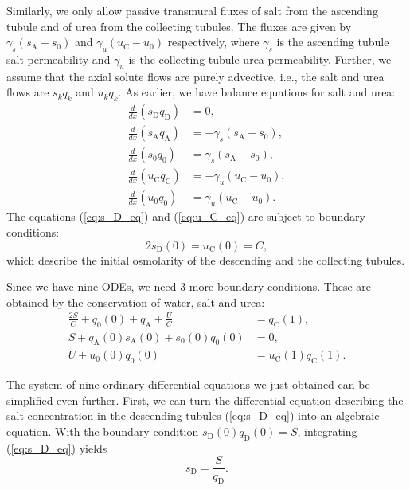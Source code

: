 \documentclass{article}
\numberwithin{equation}{section} %
\begin{document}
Similarly, we only allow passive transmural fluxes of salt from the ascending tubule and of urea from the collecting tubules.
The fluxes are given by $\gamma_s(s_\mathrm{A} - s_0)$ and $\gamma_u(u_\mathrm{C} - u_0)$ respectively, where $\gamma_s$ is the ascending tubule salt permeability and $\gamma_u$ is the collecting tubule urea permeability.
Further, we assume that the axial solute flows are purely advective, i.e., the salt and urea flows are $s_kq_k$ and $u_kq_k$.
As earlier, we have balance equations for salt and urea:
\begin{align}
    \frac{d}{dx}(s_\mathrm{D}q_\mathrm{D}) &= 0,\label{eq:s_D_eq}\\
    \frac{d}{dx}(s_\mathrm{A}q_\mathrm{A}) &= -\gamma_s(s_\mathrm{A} - s_0),\label{eq:s_A_eq}\\
    \frac{d}{dx}(s_\mathrm{0}q_\mathrm{0}) &= \gamma_s(s_\mathrm{A} - s_0),\label{eq:s_0_eq}\\
    \frac{d}{dx}(u_\mathrm{C}q_\mathrm{C}) &= -\gamma_u(u_\mathrm{C} - u_0),\label{eq:u_C_eq}\\
    \frac{d}{dx}(u_\mathrm{0}q_\mathrm{0}) &= \gamma_u(u_\mathrm{C} - u_0).\label{eq:u_0_eq}
\end{align}
The equations (\ref{eq:s_D_eq}) and (\ref{eq:u_C_eq}) are subject to boundary conditions:
\begin{equation}\label{eq:solute_bdry}
    2s_\mathrm{D}(0) = u_\mathrm{C}(0) = C,
\end{equation}
    which describe the initial osmolarity of the descending and the collecting tubules.

Since we have nine ODEs, we need 3 more boundary conditions.
These are obtained by the conservation of water, salt and urea:
\begin{align}
    \frac{2S}{C}+q_0(0)+q_\mathrm{A}+\frac{U}{C} &= q_\mathrm{C}(1),\label{eq:w_consv}\\
    S+q_\mathrm{A}(0)s_\mathrm{A}(0)+s_0(0)q_0(0) &= 0,\label{eq:s_consv}\\
    U+u_0(0)q_0(0) &= u_\mathrm{C}(1)q_\mathrm{C}(1).\label{eq:u_consv}
\end{align}



The system of nine ordinary differential equations we just obtained can be simplified even further.
First, we can turn the differential equation describing the salt concentration in the descending tubules (\ref{eq:s_D_eq}) into an algebraic equation.
With the boundary condition $s_\mathrm{D}(0)q_\mathrm{D}(0) = S$, integrating (\ref{eq:s_D_eq}) yields
\begin{equation}\label{eq:s_D}
    s_\mathrm{D} = \frac{S}{q_\mathrm{D}}.
\end{equation}
\end{document}
